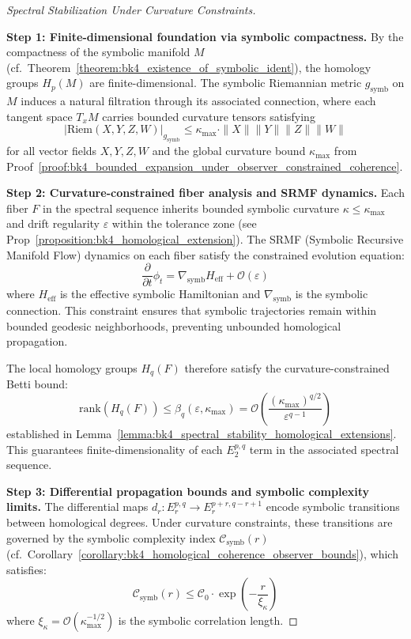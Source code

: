 \begin{proof}[Spectral Stabilization Under Curvature Constraints]
\label{proof:bk4_spectral_stability}

\textbf{Step 1: Finite-dimensional foundation via symbolic compactness.}
By the compactness of the symbolic manifold $M$ (cf.~Theorem~\ref{theorem:bk4_existence_of_symbolic_ident}), the homology groups $H_p(M)$ are finite-dimensional. The symbolic Riemannian metric $g_{\text{symb}}$ on $M$ induces a natural filtration through its associated connection, where each tangent space $T_x M$ carries bounded curvature tensors satisfying
\begin{equation}
|\text{Riem}(X,Y,Z,W)|_{g_{\text{symb}}} \leq \kappa_{\max} \cdot \|X\| \|Y\| \|Z\| \|W\|
\end{equation}
for all vector fields $X,Y,Z,W$ and the global curvature bound $\kappa_{\max}$ from Proof~\ref{proof:bk4_bounded_expansion_under_observer_constrained_coherence}.

\textbf{Step 2: Curvature-constrained fiber analysis and SRMF dynamics.}
Each fiber $F$ in the spectral sequence inherits bounded symbolic curvature $\kappa \leq \kappa_{\max}$ and drift regularity $\varepsilon$ within the tolerance zone (see Prop~\ref{proposition:bk4_homological_extension}). The SRMF (Symbolic Recursive Manifold Flow) dynamics on each fiber satisfy the constrained evolution equation:
\begin{equation}
\frac{\partial}{\partial t} \phi_t = \nabla_{\text{symb}} H_{\text{eff}} + \mathcal{O}(\varepsilon)
\end{equation}
where $H_{\text{eff}}$ is the effective symbolic Hamiltonian and $\nabla_{\text{symb}}$ is the symbolic connection. This constraint ensures that symbolic trajectories remain within bounded geodesic neighborhoods, preventing unbounded homological propagation.

The local homology groups $H_q(F)$ therefore satisfy the curvature-constrained Betti bound:
\begin{equation}
\text{rank}(H_q(F)) \leq \beta_q(\varepsilon, \kappa_{\max}) = \mathcal{O}\left(\frac{(\kappa_{\max})^{q/2}}{\varepsilon^{q-1}}\right)
\end{equation}
established in Lemma~\ref{lemma:bk4_spectral_stability_homological_extensions}. This guarantees finite-dimensionality of each $E_2^{p,q}$ term in the associated spectral sequence.

\textbf{Step 3: Differential propagation bounds and symbolic complexity limits.}
The differential maps $d_r: E_r^{p,q} \to E_r^{p+r,q-r+1}$ encode symbolic transitions between homological degrees. Under curvature constraints, these transitions are governed by the symbolic complexity index $\mathcal{C}_{\text{symb}}(r)$ (cf.~Corollary~\ref{corollary:bk4_homological_coherence_observer_bounds}), which satisfies:
\begin{equation}
\mathcal{C}_{\text{symb}}(r) \leq \mathcal{C}_0 \cdot \exp\left(-\frac{r}{\xi_{\kappa}}\right)
\end{equation}
where $\xi_{\kappa} = \mathcal{O}(\kappa_{\max}^{-1/2})$ is the symbolic correlation length.


\end{proof}
